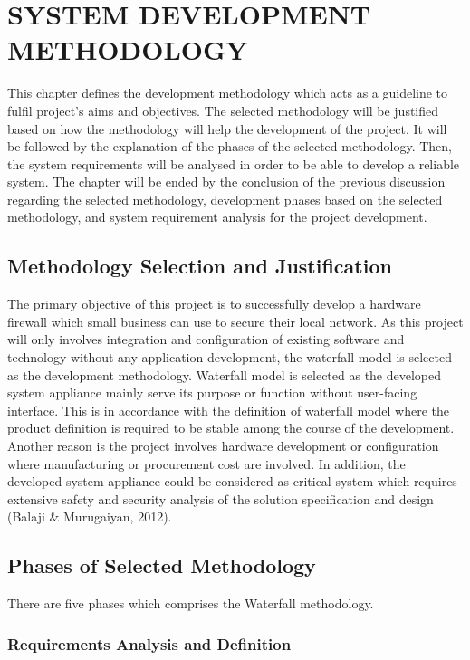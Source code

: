 \documentclass[../index.tex]{subfiles}
\begin{document}
\chapter{SYSTEM DEVELOPMENT METHODOLOGY}

This chapter defines the development methodology which acts as a guideline to fulfil project's aims
and objectives. The selected methodology will be justified based on how the methodology will help
the development of the project. It will be followed by the explanation of the phases of the selected
methodology. Then, the system requirements will be analysed in order to be able to develop a
reliable system. The chapter will be ended by the conclusion of the previous discussion regarding
the selected methodology, development phases based on the selected methodology, and system
requirement analysis for the project development.

\section{Methodology Selection and Justification}

The primary objective of this project is to successfully develop a hardware firewall which small
business can use to secure their local network. As this project will only involves integration and
configuration of existing software and technology without any application development, the waterfall
model is selected as the development methodology. Waterfall model is selected as the developed
system appliance mainly serve its purpose or function without user-facing interface. This is in
accordance with the definition of waterfall model where the product definition is required to be
stable among the course of the development. Another reason is the project involves hardware
development or configuration where manufacturing or procurement cost are involved. In addition, the
developed system appliance could be considered as critical system which requires extensive safety
and security analysis of the solution specification and design (Balaji \& Murugaiyan, 2012).

\section{Phases of Selected Methodology}

There are five phases which comprises the Waterfall methodology.

\subsection{Requirements Analysis and Definition}
\end{document}
